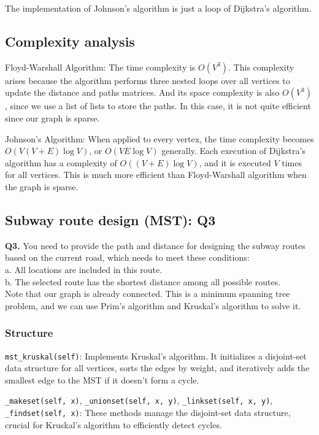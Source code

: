 \documentclass[UTF8]{ctexart}
\begin{document}
The implementation of Johnson's algorithm is just a loop of Dijkstra's algorithm.

\subsection*{Complexity analysis}
Floyd-Warshall Algorithm: The time complexity is \( O(V^3) \). This complexity arises because the algorithm performs three nested loops over all vertices to update the distance and paths matrices.
And its space complexity is also \( O(V^3) \), since we use a list of lists to store the paths. In this case, it is not quite efficient since our graph is sparse.

Johnson's Algorithm: When applied to every vertex, the time complexity becomes \( O(V(V + E) \log V) \), or \( O(VE \log V) \) generally.
Each execution of Dijkstra's algorithm has a complexity of \( O((V + E) \log V) \), and it is executed \( V \) times for all vertices.
This is much more efficient than Floyd-Warshall algorithm when the graph is sparse.


\subsection{Subway route design (MST): Q3}
\textbf{Q3.} You need to provide the path and distance for designing the subway
routes based on the current road, which needs to meet these conditions:\\
a. All locations are included in this route.\\
b. The selected route has the shortest distance among all possible routes.\\

Note that our graph is already connected.
This is a minimum spanning tree problem, and we can use Prim's algorithm and Kruskal's algorithm to solve it.
\subsubsection*{Structure}
\texttt{mst\_kruskal(self)}: Implements Kruskal's algorithm. It initializes a disjoint-set data structure for all vertices, sorts the edges by weight, and iteratively adds the smallest edge to the MST if it doesn't form a cycle.

\texttt{\_makeset(self, x)}, \texttt{\_unionset(self, x, y)}, \texttt{\_linkset(self, x, y)}, \texttt{\_findset(self, x)}: These methods manage the disjoint-set data structure, crucial for Kruskal's algorithm to efficiently detect cycles.
\end{document}

